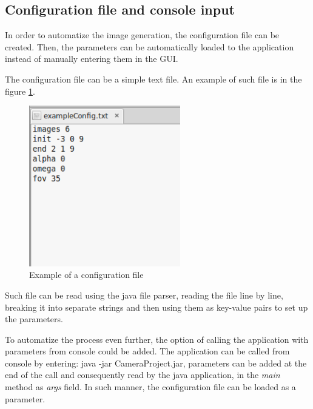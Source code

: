 \documentclass[english,12pt,a4paper,pdftex,elec,utf8]{aaltothesis}
\begin{document}
\subsection*{Configuration file and console input} 

In order to automatize the image generation, the configuration file can be created. Then, the parameters can be automatically loaded to the application instead of manually entering them in the GUI.

The configuration file can be a simple text file. An example of such file is in the figure \ref{exampleConfig}.

\begin{figure}[htb]
\centering \includegraphics[height=7cm]{exampleConfig.png}
\caption{Example of a configuration file\label{exampleConfig}}
\end{figure}

Such file can be read using the java file parser, reading the file line by line, breaking it into separate strings and then using them as key-value pairs to set up the parameters.

To automatize the process even further, the option of calling the application with parameters from console could be added. The application can be called from console by entering: java -jar CameraProject.jar, parameters can be added at the end of the call and consequently read by the java application, in the \textit{main} method as \textit{args} field. In such manner, the configuration file can be loaded as a parameter.

\clearpage
\end{document}
